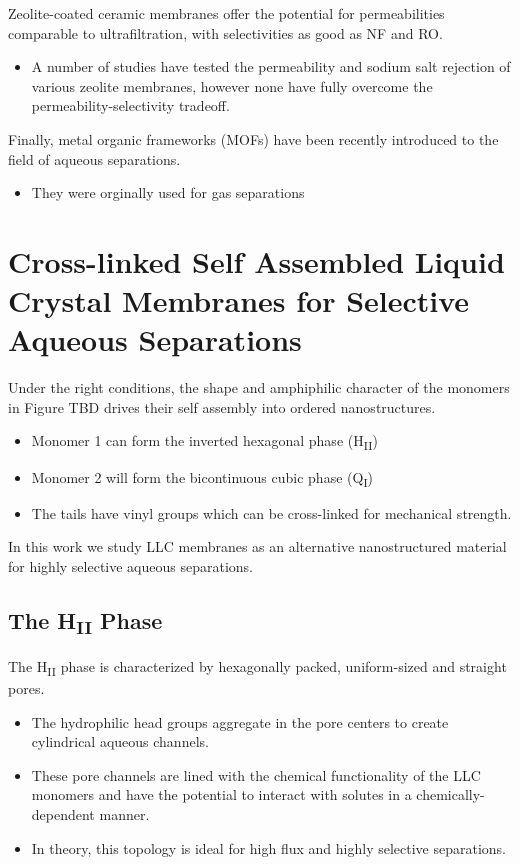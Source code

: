   Zeolite-coated ceramic membranes offer the potential for permeabilities
  comparable to ultrafiltration, with selectivities as good as NF and RO.%
  \begin{itemize}
	\item A number of studies have tested the permeability and sodium salt rejection
    of various zeolite membranes, however none have fully overcome the
    permeability-selectivity tradeoff.~\cite{pendergast_review_2011,auerbach_handbook_2003,li_novel_2007}
  \end{itemize}

  Finally, metal organic frameworks (MOFs) have been recently introduced to the
  field of aqueous separations.
  \begin{itemize}
    \item They were orginally used for gas separations
  \end{itemize}
  
  \section{Cross-linked Self Assembled Liquid Crystal Membranes for Selective Aqueous Separations}
  
  Under the right conditions, the shape and amphiphilic character of the monomers in 
  Figure TBD drives their self assembly into ordered nanostructures.
  \begin{itemize}
    \item Monomer 1 can form the inverted hexagonal phase (H\textsubscript{II})
    \item Monomer 2 will form the bicontinuous cubic phase (Q\textsubscript{I})
    \item The tails have vinyl groups which can be cross-linked for mechanical strength.
  \end{itemize}
  
  
  In this work we study LLC membranes as an alternative nanostructured material for 
  highly selective aqueous separations.
  
  \subsection{The H\textsubscript{II} Phase}
   
  The H\textsubscript{II} phase is characterized by hexagonally packed, uniform-sized
  and straight pores.
  \begin{itemize}
    \item The hydrophilic head groups aggregate in the pore centers to create
    cylindrical aqueous channels. 
    \item These pore channels are lined with the chemical functionality of the LLC monomers
    and have the potential to interact with solutes in a chemically-dependent manner.
    \item In theory, this topology is ideal for high flux and highly selective separations.
  \end{itemize}
  

